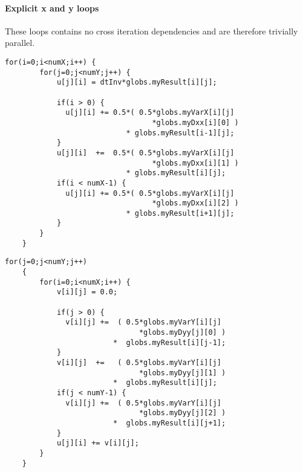 \paragraph{Explicit x and y loops} These loops contains no cross iteration dependencies and are therefore trivially parallel.
\begin{lstlisting}[caption=Explicit x loop, label=exloop]
  for(i=0;i<numX;i++) {
        for(j=0;j<numY;j++) {
            u[j][i] = dtInv*globs.myResult[i][j];

            if(i > 0) {
              u[j][i] += 0.5*( 0.5*globs.myVarX[i][j]
                                  *globs.myDxx[i][0] )
                            * globs.myResult[i-1][j];
            }
            u[j][i]  +=  0.5*( 0.5*globs.myVarX[i][j]
                                  *globs.myDxx[i][1] )
                            * globs.myResult[i][j];
            if(i < numX-1) {
              u[j][i] += 0.5*( 0.5*globs.myVarX[i][j]
                                  *globs.myDxx[i][2] )
                            * globs.myResult[i+1][j];
            }
        }
    }
\end{lstlisting}
\begin{lstlisting}[caption=Explicit y loop, label=eyloop]
    for(j=0;j<numY;j++)
    {
        for(i=0;i<numX;i++) {
            v[i][j] = 0.0;

            if(j > 0) {
              v[i][j] +=  ( 0.5*globs.myVarY[i][j]
                               *globs.myDyy[j][0] )
                         *  globs.myResult[i][j-1];
            }
            v[i][j]  +=   ( 0.5*globs.myVarY[i][j]
                               *globs.myDyy[j][1] )
                         *  globs.myResult[i][j];
            if(j < numY-1) {
              v[i][j] +=  ( 0.5*globs.myVarY[i][j]
                               *globs.myDyy[j][2] )
                         *  globs.myResult[i][j+1];
            }
            u[j][i] += v[i][j];
        }
    }
\end{lstlisting}

